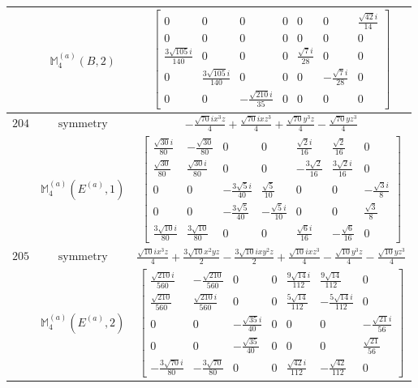 \documentclass[fleqn,8pt,landscape]{jsarticle}
\begin{document}
\begin{longtable}{ccc}
$  $ & $ \mathbb{M}_{4}^{(a)}(B,2) $ & $ \begin{bmatrix} 0 & 0 & 0 & 0 & 0 & 0 & \frac{\sqrt{42} i}{14} \\ 0 & 0 & 0 & 0 & 0 & 0 & 0 \\ \frac{3 \sqrt{105} i}{140} & 0 & 0 & 0 & \frac{\sqrt{7} i}{28} & 0 & 0 \\ 0 & \frac{3 \sqrt{105} i}{140} & 0 & 0 & 0 & - \frac{\sqrt{7} i}{28} & 0 \\ 0 & 0 & - \frac{\sqrt{210} i}{35} & 0 & 0 & 0 & 0 \end{bmatrix} $ \\ \hline
$ 204 $ & $ \text{symmetry} $ & $ - \frac{\sqrt{70} i x^{3} z}{4} + \frac{\sqrt{70} i x z^{3}}{4} + \frac{\sqrt{70} y^{3} z}{4} - \frac{\sqrt{70} y z^{3}}{4} $ \\
$  $ & $ \mathbb{M}_{4}^{(a)}(E^{(a)},1) $ & $ \begin{bmatrix} \frac{\sqrt{30} i}{80} & - \frac{\sqrt{30}}{80} & 0 & 0 & \frac{\sqrt{2} i}{16} & \frac{\sqrt{2}}{16} & 0 \\ \frac{\sqrt{30}}{80} & \frac{\sqrt{30} i}{80} & 0 & 0 & - \frac{3 \sqrt{2}}{16} & \frac{3 \sqrt{2} i}{16} & 0 \\ 0 & 0 & - \frac{3 \sqrt{5} i}{40} & \frac{\sqrt{5}}{10} & 0 & 0 & - \frac{\sqrt{3} i}{8} \\ 0 & 0 & - \frac{3 \sqrt{5}}{40} & - \frac{\sqrt{5} i}{10} & 0 & 0 & \frac{\sqrt{3}}{8} \\ \frac{3 \sqrt{10} i}{80} & \frac{3 \sqrt{10}}{80} & 0 & 0 & \frac{\sqrt{6} i}{16} & - \frac{\sqrt{6}}{16} & 0 \end{bmatrix} $ \\ \hline
$ 205 $ & $ \text{symmetry} $ & $ \frac{\sqrt{10} i x^{3} z}{4} + \frac{3 \sqrt{10} x^{2} y z}{2} - \frac{3 \sqrt{10} i x y^{2} z}{2} + \frac{\sqrt{10} i x z^{3}}{4} - \frac{\sqrt{10} y^{3} z}{4} - \frac{\sqrt{10} y z^{3}}{4} $ \\
$  $ & $ \mathbb{M}_{4}^{(a)}(E^{(a)},2) $ & $ \begin{bmatrix} \frac{\sqrt{210} i}{560} & - \frac{\sqrt{210}}{560} & 0 & 0 & \frac{9 \sqrt{14} i}{112} & \frac{9 \sqrt{14}}{112} & 0 \\ \frac{\sqrt{210}}{560} & \frac{\sqrt{210} i}{560} & 0 & 0 & \frac{5 \sqrt{14}}{112} & - \frac{5 \sqrt{14} i}{112} & 0 \\ 0 & 0 & - \frac{\sqrt{35} i}{40} & 0 & 0 & 0 & - \frac{\sqrt{21} i}{56} \\ 0 & 0 & - \frac{\sqrt{35}}{40} & 0 & 0 & 0 & \frac{\sqrt{21}}{56} \\ - \frac{3 \sqrt{70} i}{80} & - \frac{3 \sqrt{70}}{80} & 0 & 0 & \frac{\sqrt{42} i}{112} & - \frac{\sqrt{42}}{112} & 0 \end{bmatrix} $ \\ \hline

\end{longtable}
\end{document}
